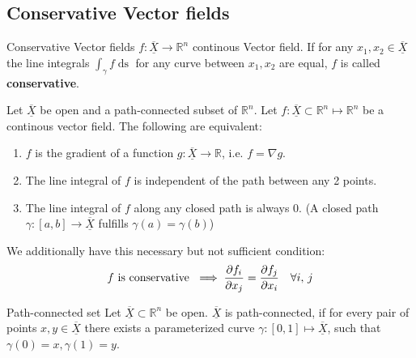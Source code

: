 \documentclass[a4paper,fontsize = 8pt]{scrartcl}
\def\R{\mathbb{R}}
\def\X{\underline{\overline{X}}}
\begin{document}
\subsection{Conservative Vector fields}
\begin{subbox}{Conservative Vector fields}
    $f: \X \to \R^n$ continous Vector field. If for any $x_1, x_2 \in \X$ the line integrals $\int_{\gamma}f \mathop{ds}$ for any curve between $x_1,x_2$ are equal, $f$ is called \textbf{conservative}.
\end{subbox}

Let \(\X\) be open and a path-connected subset of $\R^n$. Let \(f: \X \subset \R^n \mapsto \R^n\) be a continous vector field. The following are equivalent:
\begin{enumerate}
  \item $f$ is the gradient of a function $g: \X \to \R$, i.e. $f = \nabla g$.
  \item The line integral of $f$ is independent of the path between any 2 points.
  \item The line integral of $f$ along any closed path is always $0$. (A closed path $\gamma: [a, b] \to \X$ fulfills $\gamma(a) =\gamma(b)$)
\end{enumerate}
We additionally have this necessary but not sufficient condition:
\[f \text{ is conservative }\implies \pdv{f_i}{x_j} = \pdv{f_j}{x_i} \quad \forall i,\, j\]

\begin{subbox}{Path-connected set}
  Let \(\X \subset \R^n\) be open. \(\X\) is path-connected, if for every pair of points \(x, y \in \X\) there exists a parameterized curve \(\gamma : \left[0, 1\right] \mapsto \X\), such that \(\gamma(0) = x, \gamma(1) = y\).
\end{subbox}
\end{document}
